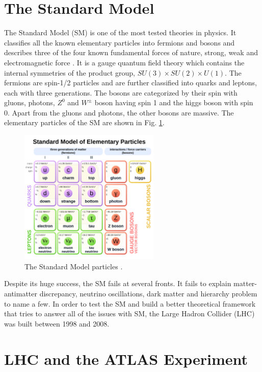 \documentclass[a4paper]{report}
\numberwithin{equation}{section}
\begin{document}
\section{The Standard Model}
The Standard Model (SM) is one of the most tested theories in physics. It classifies all the known elementary particles into fermions and bosons and describes three of the four known fundamental forces of nature, strong, weak and electromagnetic force \cite{ParticleDataGroup:2020ssz}. It is a gauge quantum field theory which contains the internal symmetries of the product group, $SU(3) \times SU(2) \times U(1)$. The fermions are spin-1/2 particles and are further classified into quarks and leptons, each with three generations. The bosons are categorized by their spin with gluons, photons, $Z^0$ and $W^{\pm}$ boson having spin 1 and the higgs boson with spin 0. Apart from the gluons and photons, the other bosons are massive. The elementary particles of the SM are shown in Fig. \ref{fig:sm}.

\begin{figure}[htpb]
    \centering
    \includegraphics[width=0.6\textwidth]{sm.svg.png}
    \caption{The Standard Model particles \cite{wiki:xxx}.}
    \label{fig:sm}
\end{figure}

Despite its huge success, the SM fails at several fronts. It fails to explain matter-antimatter discrepancy, neutrino oscillations, dark matter and hierarchy problem to name a few. In order to test the SM and build a better theoretical framework that tries to answer all of the issues with SM, the Large Hadron Collider (LHC) was built between 1998 and 2008. 

\section{LHC and the ATLAS Experiment} \label{sec:lhc_and_atlas}
\end{document}
